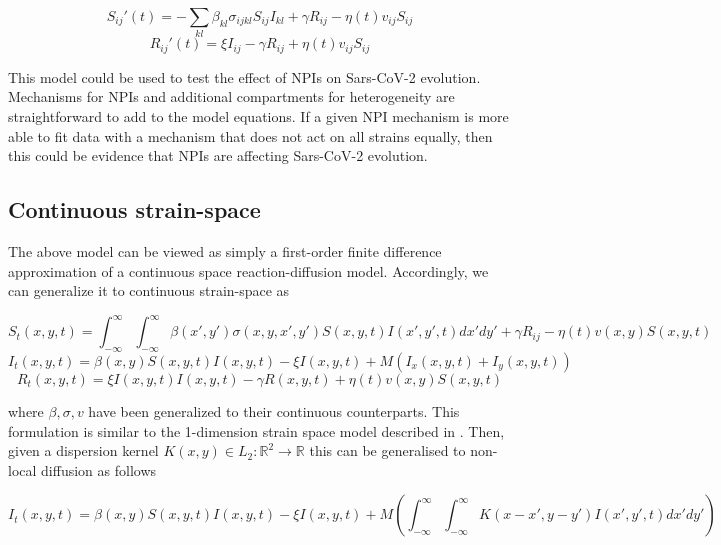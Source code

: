 \documentclass{article}
\begin{document}
\begin{equation}
    S_{ij}'(t) = -\sum_{kl} \beta_{kl} \sigma_{ijkl} S_{ij} I_{kl} + \gamma R_{ij} -  \eta(t) v_{ij} S_{ij} \label{Seqn}
\end{equation}
\begin{equation}
    R_{ij}'(t) = \xi I_{ij} - \gamma R_{ij} + \eta(t) v_{ij} S_{ij} \label{Reqn}
\end{equation}


This model could be used to test the effect of NPIs on Sars-CoV-2 evolution. Mechanisms for NPIs and additional compartments for heterogeneity are straightforward to add to the model equations. If a given NPI mechanism is more able to fit data with a mechanism that does not act on all strains equally, then this could be evidence that NPIs are affecting Sars-CoV-2 evolution. 

\subsection{Continuous strain-space}

The above model can be viewed as simply a first-order finite difference approximation of a continuous space reaction-diffusion model. Accordingly, we can generalize it to continuous strain-space as
 
\begin{equation}
    S_t(x,y,t) = \int_{-\infty}^{\infty} \int_{-\infty}^{\infty} \beta(x',y') \sigma(x,y,x', y') S(x,y,t) I(x',y',t) dx' dy' + \gamma R_{ij} -  \eta(t) v(x,y) S(x,y,t)\label{Seqn_cts}
\end{equation}
\begin{equation}
    I_t(x,y,t) = \beta(x,y) S(x,y,t) I(x,y,t)- \xi I(x,y,t) + M \left(I_x(x,y,t)  + I_y(x,y,t)  \right) \label{Ieqn_cts}    
\end{equation}
\begin{equation}
    R_t(x,y,t) = \xi I(x,y,t)I(x,y,t) - \gamma R(x,y,t) + \eta(t) v(x,y) S(x,y,t) \label{Reqn_cts}
\end{equation}


where $\beta, \sigma, v$ have been generalized to their continuous counterparts. This formulation is similar to the 1-dimension strain space model described in \cite{Bessonov_Bocharov_Meyerhans_Popov_Volpert_2021}. Then, given a dispersion kernel $K(x,y) \in L_2: \mathbb{R}^2 \to \mathbb{R}$ this can be generalised to non-local diffusion as follows

\begin{equation}
    I_t(x,y,t) = \beta(x,y) S(x,y,t) I(x,y,t)- \xi I(x,y,t) + M \left(\int_{-\infty}^{\infty} \int_{-\infty}^{\infty} K(x-x',y-y')I(x',y',t) dx' dy' \right) \label{Ieqn_cts_nonlocal}    
\end{equation}
\end{document}

